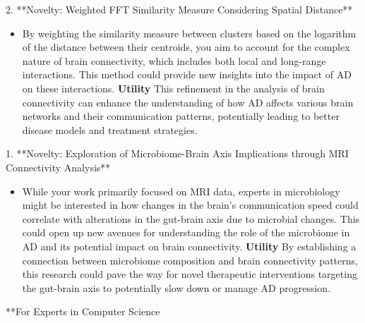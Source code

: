 \documentclass[twocolumn]{article}
\begin{document}
2. **Novelty: Weighted FFT Similarity Measure Considering Spatial Distance**
\begin{itemize}
\item By weighting the similarity measure between clusters based on the logarithm of the distance between their centroids, you aim to account for the complex nature of brain connectivity, which includes both local and long-range interactions. This method could provide new insights into the impact of AD on these interactions.
   \noindent \textbf{Utility} This refinement in the analysis of brain connectivity can enhance the understanding of how AD affects various brain networks and their communication patterns, potentially leading to better disease models and treatment strategies.
\end{itemize}

1. **Novelty: Exploration of Microbiome-Brain Axis Implications through MRI Connectivity Analysis**
\begin{itemize}
\item While your work primarily focused on MRI data, experts in microbiology might be interested in how changes in the brain's communication speed could correlate with alterations in the gut-brain axis due to microbial changes. This could open up new avenues for understanding the role of the microbiome in AD and its potential impact on brain connectivity.
   \noindent \textbf{Utility} By establishing a connection between microbiome composition and brain connectivity patterns, this research could pave the way for novel therapeutic interventions targeting the gut-brain axis to potentially slow down or manage AD progression.

\end{itemize}
**For Experts in Computer Science%
\end{document}

